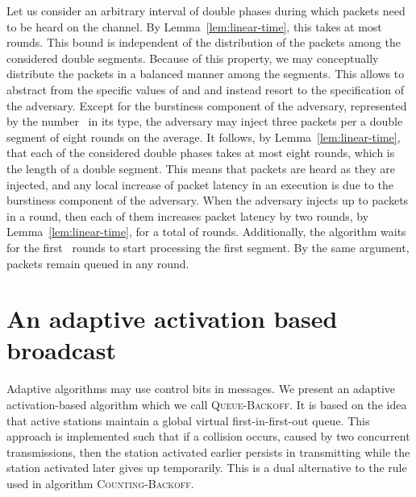 \documentclass[11pt]{article}
\newcommand{\qed}{\hfill  \smallbreak}
\newenvironment{proof}{\noindent{\bf Proof:}}{\qed}
\begin{document}
\begin{proof} 
Let us consider an arbitrary interval of  double phases during which  packets need to be heard on the channel.
By Lemma~\ref{lem:linear-time}, this takes at most  rounds.
This bound is independent of the distribution of the  packets among the   considered double segments.
Because of this property, we may conceptually distribute the  packets in a balanced manner among the  segments.
This allows to abstract from the specific values of  and  and instead resort to the specification of the adversary.
Except for the burstiness component of the adversary, represented by the number~ in its type, the adversary may inject three packets per a double segment of eight rounds on the average.
It follows, by Lemma~\ref{lem:linear-time}, that each of the considered double phases takes at most eight rounds, which is the length of a double segment.
This means that packets are heard as they are injected, and any local increase of packet latency in an execution is due to the burstiness component of the adversary. 
When the adversary injects up to  packets in a round, then each of them  increases packet latency by two rounds, by Lemma~\ref{lem:linear-time}, for a total of  rounds.
Additionally, the algorithm waits for the first ~rounds to start processing the first segment.
By the same argument,  packets remain queued in any round.
\end{proof} 



\section{An adaptive  activation based broadcast}

\label{sec:adaptive-activation-based}



Adaptive algorithms may use control bits in messages.
We present an adaptive activation-based algorithm which we call \textsc{Queue-Backoff}.
It is based on the idea that active stations maintain a global virtual first-in-first-out queue.
This approach is implemented such that if a collision occurs, caused by two concurrent transmissions, then the station activated earlier persists in transmitting while the station activated later gives up temporarily.
This is a dual alternative to the rule used in algorithm \textsc{Counting-Backoff}.
\end{document}
